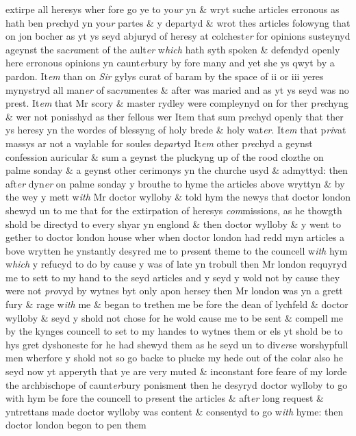 \documentclass[12pt, a4paper]{book}
\begin{document}
		
		\ifthenelse{\isodd{\thepage}}
		{\reversemarginpar}
		{\normalmarginpar}
		extirpe all heresys wher fore go ye to yo\textit{ur} yn \& wryt suche articles erronous as hath ben p\textit{re}chyd yn yo\textit{ur} partes \& y departyd \& wrot thes articles folowyng that on jon bocher as yt ys seyd abjuryd of heresy at colchest\textit{er} for opinions susteynyd ageynst the sac\textit{ra}ment of the ault\textit{er} w\textit{hich} hath syth spoken \&  defendyd openly here erronous opinions yn caunt\textit{er}bury by fore many and  yet she ys qwyt by a pardon. It\textit{em} than on \textit{Sir} gylys curat of baram by the  space of ii or iii yeres mynystryd all man\textit{er} of sac\textit{ra}mentes \& after was maried
			 and as yt ys seyd was no prest. It\textit{em} that Mr scory \& master rydley were compleynyd on for ther p\textit{re}chyng \& wer not ponisshyd as ther fellous wer Item that sum p\textit{re}chyd openly that ther ys heresy yn the wordes of blessyng of  holy brede \& holy wat\textit{er}. It\textit{em} that p\textit{ri}vat massys ar not a vaylable for soules de\textit{par}tyd It\textit{em} other p\textit{re}chyd a geynst confession auricular \& sum a geynst the pluckyng up of the rood clozthe on palme sonday \& a geynst other cerimonys yn the churche usyd \& admyttyd: then aft\textit{er} dyn\textit{er} on palme sonday y brouthe to hyme the articles above wryttyn \& by the wey y mett w\textit{ith} Mr doctor wylloby \& told hym the newys that doctor london shewyd un to me that for the extirpation of heresys \textit{com}missions, as he thowgth shold be directyd to every shyar yn englond \& then doctor wylloby \& y went to gether to doctor london house wher when doctor london had redd myn articles a bove wrytten he ynstantly desyred me to p\textit{re}sent theme to the councell w\textit{ith} hym w\textit{hich} y refucyd to do by cause y was of late yn trobull then Mr london requyryd me to  sett to my hand to the seyd articles and y seyd y wold not by cause they were not \textit{pro}vyd by wytnes byt only apon hersey then Mr london was yn a  grett fury \& rage w\textit{ith} me \& began to trethen me be fore the dean of lychfeld \& doctor wylloby \& seyd y shold not chose for he wold cause me to be sent  \& compell me by the kynges councell
			 to set to my handes to wytnes them or els yt shold be to hys gret dyshoneste for he had shewyd them as he seyd un to div\textit{er}se worshypfull men wherfore y shold not so go backe to plucke my hede out of the colar also he seyd now yt apperyth that ye are very muted
			 \& inconstant fore feare of my lorde the archbischope of caunt\textit{er}bury ponisment then he desyryd doctor wylloby to go with hym be fore the councell to p\textit{re}sent the articles \& aft\textit{er} long request \& yntrettans made doctor wylloby was content \& consentyd to go w\textit{ith} hyme: then doctor london begon
			 to pen them
               
\end{document}

